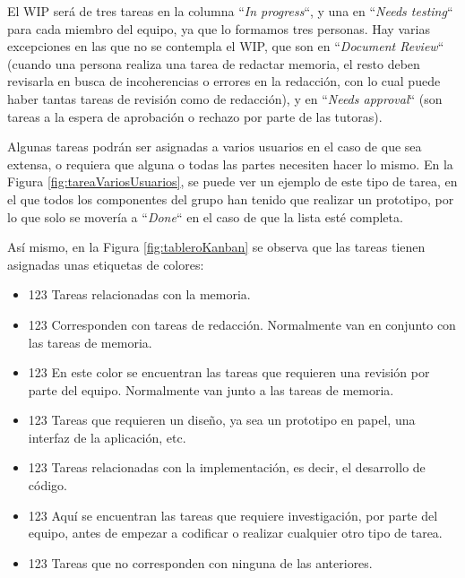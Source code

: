 	
	El WIP ser\'a de tres tareas en la columna ``\textit{In progress}``, y una en ``\textit{Needs testing}`` para cada miembro del equipo, ya que lo formamos tres personas. Hay varias excepciones en las que no se contempla el WIP, que son en ``\textit{Document Review}`` (cuando una persona realiza una tarea de redactar memoria, el resto deben revisarla en busca de incoherencias o errores en la redacci\'on, con lo cual puede haber tantas tareas de revisi\'on como de redacci\'on), y en ``\textit{Needs approval}`` (son tareas a la espera de aprobaci\'on o rechazo por parte de las tutoras).
	
	Algunas tareas podr\'an ser asignadas a varios usuarios en el caso de que sea extensa, o requiera que alguna o todas las partes necesiten hacer lo mismo. En la Figura \ref{fig:tareaVariosUsuarios}, se puede ver un ejemplo de este tipo de tarea, en el que todos los componentes del grupo han tenido que realizar un prototipo, por lo que solo se mover\'ia a ``\textit{Done}`` en el caso de que la lista est\'e completa.
	
	As\'i mismo, en la Figura \ref{fig:tableroKanban} se observa que las tareas tienen asignadas unas etiquetas de colores:
	
	\begin{itemize}
		\item \colorbox{naranja}{\textcolor{naranja}{123}} Tareas relacionadas con la memoria.
		\item \colorbox{rosa}{\textcolor{rosa}{123}} Corresponden con tareas de redacci\'on. Normalmente van en conjunto con las tareas de memoria.
		\item \colorbox{azul}{\textcolor{azul}{123}} En este color se encuentran las tareas que requieren una revisi\'on por parte del equipo. Normalmente van junto a las tareas de memoria.
		\item \colorbox{azulClaro}{\textcolor{azulClaro}{123}} Tareas que requieren un dise\~{n}o, ya sea un prototipo en papel, una interfaz de la aplicaci\'on, etc.
		\item \colorbox{rojo}{\textcolor{rojo}{123}} Tareas relacionadas con la implementaci\'on, es decir, el desarrollo de c\'odigo.
		\item \colorbox{morado}{\textcolor{morado}{123}} Aqu\'i se encuentran las tareas que requiere investigaci\'on, por parte del equipo, antes de empezar a codificar o realizar cualquier otro tipo de tarea.
		\item \colorbox{azulOscuro}{\textcolor{azulOscuro}{123}} Tareas que no corresponden con ninguna de las anteriores.
	\end{itemize}

